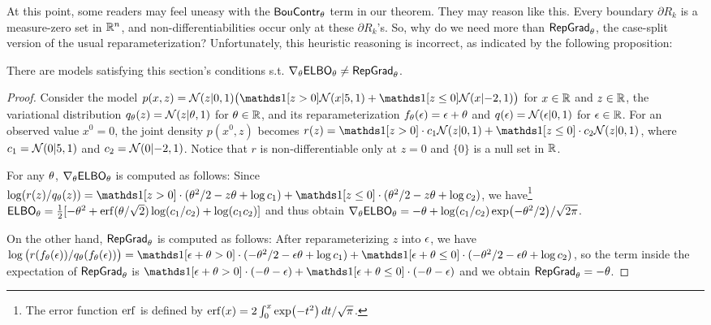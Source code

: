 At this point, some readers may feel uneasy with the $\mathsf{BouContr}_\theta$ term in our theorem.
They may reason like this. Every boundary $\partial R_k$ is a measure-zero set in $\mathbb{R}^n$, and non-differentiabilities occur only at these $\partial R_k$'s. So, why do we need more than $\mathsf{RepGrad}_\theta$, the case-split version of the usual reparameterization? Unfortunately, this heuristic reasoning is incorrect, as indicated by the following proposition:
\begin{proposition}
There are models satisfying this section's conditions s.t. $\nabla_{\theta}{{\mathsf{ELBO}_{\theta}}} \neq \mathsf{RepGrad}_\theta$.
\end{proposition}
\begin{proof}
  Consider the model $p(x,z) = \Dnormal(z|0,1) \big(\indc{z > 0}\Dnormal(x|5,1) + \indc{z \leq 0}\Dnormal(x|{-}2,1)\big)$ for $x \in \mathbb{R}$ and $z \in \mathbb{R}$,
  the variational distribution $q_\theta(z) = \mathcal{N}(z|\theta,1)$ for $\theta \in \mathbb{R}$,
  and its reparameterization $f_\theta(\epsilon) = \epsilon + \theta$
  and $q(\epsilon) = \mathcal{N}(\epsilon|0,1)$ for $\epsilon \in \mathbb{R}$.
  For an observed value $x^0 = 0$, the joint density $p(x^0,z)$ becomes
  $r(z) = \indc{z > 0}\cdot c_1 \Dnormal(z|0,1) + \indc{z \leq 0} \cdot c_2 \Dnormal(z|0,1)$,
  where $c_1 = \mathcal{N}(0|5,1)$ and $c_2 = \mathcal{N}(0|{-}2,1)$.
  Notice that $r$ is non-differentiable only at $z=0$
  and $\{0\}$ is a null set in $\mathbb{R}$.

  For any $\theta$,
  $\nabla_{\theta}{\mathsf{ELBO}_{\theta}}$ is computed as follows:
  Since
  $\log({r(z)}/{q_\tht(z)}) =
  \indc{z>    0} \cdot ( \tht^2/2 - z\tht + \log c_1 ) +
  \indc{z\leq 0} \cdot ( \tht^2/2 - z\tht + \log c_2 )$,
  we have\footnote{The error function $\erf$ is defined by
  $\erf(x) = 2 \int_0^x \exp(-t^2)\,dt / \sqrt{\pi}$.}
  $\ELBO{\tht}
  = \frac{1}{2}[-\tht^2
  + \erf({\tht}/{\sqrt{2}})\log({c_1/c_2})
  + \log(c_1c_2)]$
  and thus obtain
  $\nabla_{\theta} {\mathsf{ELBO}_{\theta}}
  = -\theta + \log({c_1}/{c_2}) \exp(-{\theta^2}/{2}) /\sqrt{2\pi}$.

  On the other hand, $\mathsf{RepGrad}_\theta$ is computed as follows:
  After reparameterizing $z$ into $\epsilon$, we have
  $\log\big({r(f_\tht(\eps))} / {q_\tht(f_\tht(\eps))}\big) =
  \indc{\eps+\tht>    0} \cdot ( -\tht^2/2 - \eps\tht + \log c_1 ) +
  \indc{\eps+\tht\leq 0} \cdot ( -\tht^2/2 - \eps\tht + \log c_2 )$,
  so the term inside the expectation of $\mathsf{RepGrad}_\theta$ is
  $ \indc{\eps+\tht>    0} \cdot ( -\tht - \eps ) +
  \indc{\eps+\tht\leq 0} \cdot ( -\tht - \eps )$
  and we obtain $\mathsf{RepGrad}_\theta = -\theta$.


\end{proof}
